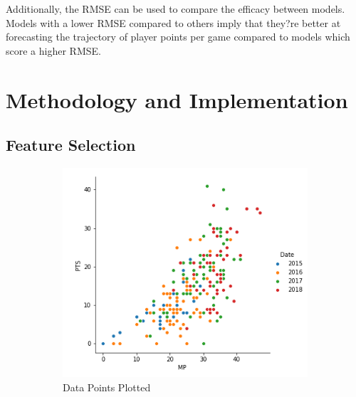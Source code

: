 \documentclass[a4paper,11pt,twoside]{article}
\begin{document}
Additionally, the RMSE can be used to compare the efficacy between models. Models with a lower RMSE compared to others imply that they?re better at forecasting the trajectory of player points per game compared to models which score a higher RMSE.





\section{Methodology and Implementation}

\subsection{Feature Selection}

\begin{figure} [h!]
  \centering
  \begin{subfigure}[b]{0.4\textwidth}
    \includegraphics[width=\textwidth]{pairplot1.png}
    \caption{Data Points Plotted}
    \label{fig:1}
  \end{subfigure}
  \begin{subfigure}[b]{0.4\textwidth}

\end{subfigure}
\end{figure}
\end{document}
